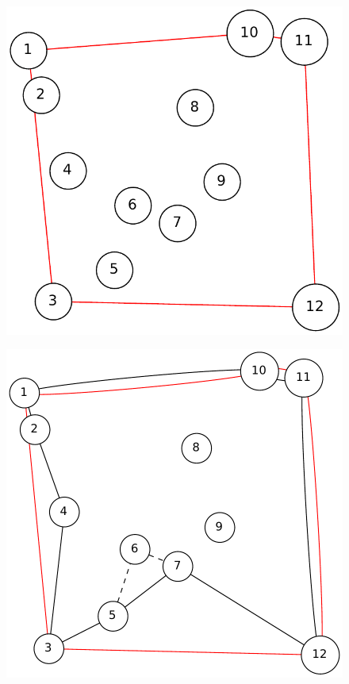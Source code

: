 \begin{figure}[h]
    \centering
    \begin{minipage}{.33\textwidth}
        \centering
        \includegraphics[width=0.8\linewidth]{figures/heura}
        \label{fig:sub1}
    \end{minipage}%
    \begin{minipage}{.33\textwidth}
        \centering
        \includegraphics[width=0.8\linewidth]{figures/heurb}
        \label{fig:sub2}
    \end{minipage}
    \begin{minipage}{.33\textwidth}
        \centering

\end{minipage}
\end{figure}
